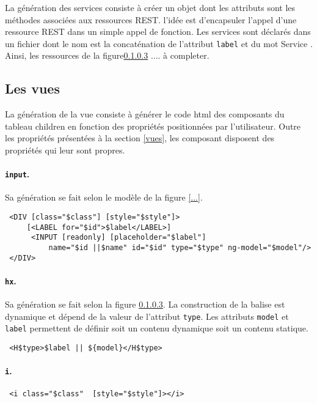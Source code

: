 \documentclass[a4paper,11pt]{report}
\begin{document}
La génération des services consiste à créer un objet dont les attributs sont les méthodes associées aux ressources REST. 
l'idée est d'encapsuler l'appel d'une ressource REST dans un simple appel de fonction. Les services sont déclarés dans un fichier
 dont le nom est la concaténation de l'attribut {\tt label} et du mot \og Service \fg .  Ainsi, les ressources de la figure\ref{} .... à completer.
 
\subsection{Les vues}

La génération de la vue consiste à générer le code html des composants du tableau children en fonction des propriétés positionnées par
l'utilisateur. Outre les propriétés présentées à la section \ref{vues}, les composant disposent des propriétés qui leur sont propres.


\paragraph{{\tt input}.} Sa génération se fait selon le modèle de la figure \ref{...}. 
\begin{verbatim}
 <DIV [class="$class"] [style="$style"]>
     [<LABEL for="$id">$label</LABEL>]
      <INPUT [readonly] [placeholder="$label"] 
	      name="$id ||$name" id="$id" type="$type" ng-model="$model"/>
 </DIV>
\end{verbatim}

\paragraph{{\tt hx}.}Sa génération se fait selon la figure \ref{}. La construction de la balise est dynamique
et dépend de la valeur de l'attribut {\tt type}. Les attributs {\tt model} et {\tt label} permettent de définir soit
un contenu dynamique soit un contenu statique. 

\begin{verbatim}
 <H$type>$label || ${model}</H$type>
\end{verbatim}

\paragraph{{\tt i}.} 
\begin{verbatim}
 <i class="$class"  [style="$style"]></i>
\end{verbatim}
\end{document}
